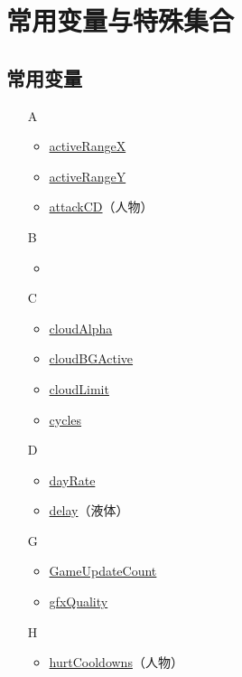 \chapter{常用变量与特殊集合}
\section{常用变量}
\begin{multicols}{2}[]
{\ttfamily
\begin{itemize}
\item[A] \begin{itemize}
	\item \hyperref[tab9]{activeRangeX}
	\item \hyperref[tab9]{activeRangeY}
	\item \hyperref[sec28]{attackCD}（人物）
	\end{itemize}
\item[B] \begin{itemize}
	\item \hyperref[sec9]{}
	\end{itemize}
\item[C] \begin{itemize}
	\item \href{https://www.bbstr.net/threads/133/#post-623}{cloudAlpha}
	\item \href{https://www.bbstr.net/threads/133/#post-623}{cloudBGActive}
	\item \href{https://www.bbstr.net/threads/133/#post-623}{cloudLimit}
	\item \hyperref[tab10]{cycles}
	\end{itemize}
\item[D] \begin{itemize}
	\item \href{https://www.bbstr.net/threads/133/#post-623}{dayRate}
	\item \hyperref[tab10]{delay}（液体）
	\end{itemize}
\item[G] \begin{itemize}
	\item \hyperref[sec27]{GameUpdateCount}
	\item \hyperref[app34]{gfxQuality}
	\end{itemize}
\item[H] \begin{itemize}
	\item \hyperref[sec29]{hurtCooldowns}（人物）
	\end{itemize}

\end{itemize}}
\end{multicols}
